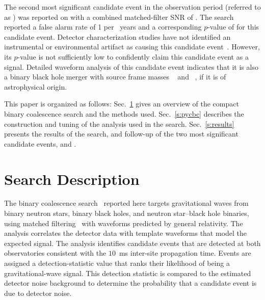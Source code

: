 The second most significant candidate event in the observation period
(referred to as \SECONDMONDAY{}) was reported on \SecondTime{} with a combined
matched-filter SNR of \PyCBCSecondEventRhoC.  The search reported a false
alarm rate of 1 per \CBCSECONDEVENTIFAR~years and a corresponding $p$-value 
 of \CBCSECONDEVENTFAP{} for this candidate event.  Detector
characterization studies have not identified an instrumental or environmental
artifact as causing this candidate event~\cite{GW150914-DETCHAR}. However, its
$p$-value is not sufficiently low to confidently claim this
candidate event as a signal.  Detailed waveform analysis of this candidate
event indicates that it is also a binary black hole merger with source frame
masses {\MONESCOMPACTSecondMonday~\Msun} and
{\MTWOSCOMPACTSecondMonday~\Msun}, if it is of astrophysical origin.
 
This paper is organized as follows: Sec.~\ref{s:overview} gives an overview of
the compact binary coalescence search and the methods used.
Sec.~\ref{s:pycbc} describes the construction and
tuning of the analysis used in the search.
Sec.~\ref{s:results} presents the results of the search, and follow-up of the
two most significant candidate events, \TheEvent{} and \SECONDMONDAY{}.


\section{Search Description}
\label{s:overview}

The binary coalescence
search~\cite{thorne.k:1987,Sathyaprakash:1991mt,Cutler:1992tc,Finn:1992wt,Finn:1992xs,Dhurandhar:1992mw,Balasubramanian:1995bm,Flanagan:1997sx}
reported here targets gravitational waves from binary neutron stars, binary
black holes, and neutron star--black hole binaries, using matched
filtering~\cite{wainstein:1962} with waveforms predicted by general
relativity.  The \pycbc{} analysis correlates the detector
data with template waveforms that model the expected signal. The analysis
identifies candidate events that are detected at both observatories consistent
with the $10$~ms inter-site propagation time. Events are assigned a
detection-statistic value that ranks their likelihood of being a
gravitational-wave signal. This detection statistic is compared to the
estimated detector noise background to determine the probability that a
candidate event is due to detector noise. 

